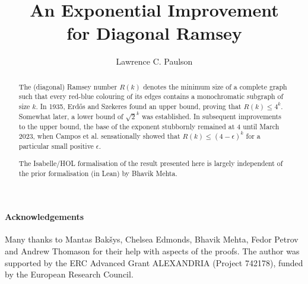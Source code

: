 \documentclass[11pt,a4paper]{article}
\begin{document}
\title{An Exponential Improvement\\ for Diagonal Ramsey}
\author{Lawrence C. Paulson}
\maketitle

\begin{abstract}

The (diagonal) Ramsey number $R(k)$ denotes the minimum size of a complete graph such that every red-blue colouring of its edges contains a monochromatic subgraph of size $k$.
In 1935, Erd\H{o}s and Szekeres found an upper bound, proving that $R(k)\le 4^k$. Somewhat later, a lower bound of $\sqrt{2}^k$ was established.
In subsequent improvements to the upper bound, the base of the exponent stubbornly 
remained at 4 until March 2023, when Campos et al. \cite{campos-exponential-ramsey}
sensationally showed that $R(k)\le (4-\epsilon)^k$ for a particular
small positive $\epsilon$.

The Isabelle/HOL formalisation of the result presented here is largely
independent of the prior formalisation (in Lean) by Bhavik Mehta.
\end{abstract}

\newpage
\tableofcontents

\paragraph*{Acknowledgements}
Many thanks to Mantas Bakšys, Chelsea Edmonds, Bhavik Mehta, Fedor Petrov and Andrew Thomason for their help with aspects of the proofs.
The author was supported by the ERC Advanced Grant ALEXANDRIA (Project 742178), funded by the European Research Council. 

\newpage





\end{document}
